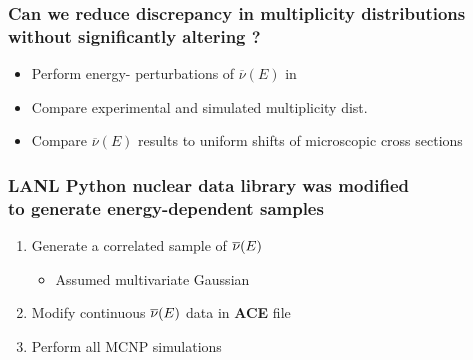 \begin{frame}
\frametitle{Can we reduce discrepancy in multiplicity distributions \\ without significantly
altering \keff?}
{\addtolength\leftmargini{-0.2in}
 \addtolength\wideitemsep{0.1in}
\begin{itemize}
    \item[] Perform energy- perturbations of $\overline{\nu}(E)$  in
         \\ 
    \item[] Compare experimental and simulated multiplicity dist. 
            \\ 
        \item[] Compare $\overline{\nu}(E)$ results to uniform shifts of
		microscopic cross sections 
	\end{itemize}	
}
\end{frame} 











\begin{frame}
\frametitle{LANL Python nuclear data library was modified \\ to generate energy-dependent \nubar  samples}
{\addtolength\wideitemsep{0.2in}
\begin{enumerate}
	\item Generate a correlated sample of $\overline{\nu}(E)$ 
        \begin{itemize}\vspace{0.1in}
            \item {Assumed multivariate
                    Gaussian \\ }
    \end{itemize}
  \item Modify continuous $\overline{\nu}(E)$ data in \textbf{ACE} file 
  \item Perform all MCNP simulations \\ 
\end{enumerate} 
}
\end{frame} 



